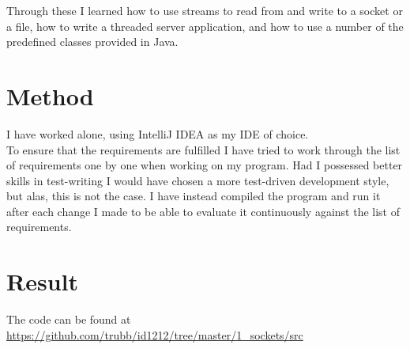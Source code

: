 \documentclass[a4paper]{scrartcl}
\begin{document}
Through these I learned how to use streams to read from and write to a socket or a file, how to write a threaded server application, and how to use a number of the predefined classes provided in Java.

\section{Method}

I have worked alone, using IntelliJ IDEA as my IDE of choice.\\
To ensure that the requirements are fulfilled I have tried to work through the list of requirements one by one when working on my program. Had I possessed better skills in test-writing I would have chosen a more test-driven development style, but alas, this is not the case. I have instead compiled the program and run it after each change I made to be able to evaluate it continuously against the list of requirements.

\section{Result}

The code can be found at\\
\url{https://github.com/trubb/id1212/tree/master/1_sockets/src}
\end{document}
